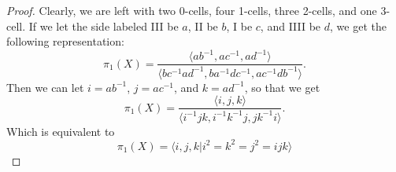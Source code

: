 \documentclass[12pt]{article}
\begin{document}
\begin{proof}
  \par Clearly, we are left with two 0-cells, four 1-cells, three 2-cells, and one 3-cell. If we let the side labeled III be $a$, 
    II be $b$, I be $c$, and IIII be $d$, we get the following representation:
    \begin{equation*}
      \pi_1(X) = \frac{ \langle ab^{-1}, ac^{-1}, ad^{-1} \rangle }{ \langle bc^{-1}ad^{-1}, ba^{-1}dc^{-1}, ac^{-1}db^{-1} \rangle}.
    \end{equation*}
    Then we can let $i=ab^{-1}$, $j=ac^{-1}$, and $k=ad^{-1}$, so that we get 
    \begin{equation*} 
      \pi_1(X) = \frac{ \langle i,j,k \rangle }{ \langle i^{-1}jk, i^{-1}k^{-1}j, jk^{-1}i \rangle}.
    \end{equation*}
    Which is equivalent to 
    \begin{equation*}
      \pi_1(X) = \langle i,j,k \vert i^2 = k^2 = j^2 = ijk \rangle 
    \end{equation*}
\end{proof}
\end{document}
